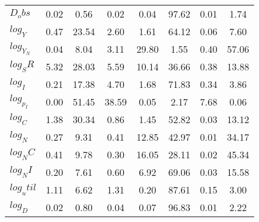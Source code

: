 \begin{center}
\begin{longtable}{lccccccc}
$D_obs     $	 & 	        0.02	 & 	        0.56	 & 	        0.02	 & 	        0.04	 & 	       97.62	 & 	        0.01	 & 	        1.74 \\ 
$log_Y     $	 & 	        0.47	 & 	       23.54	 & 	        2.60	 & 	        1.61	 & 	       64.12	 & 	        0.06	 & 	        7.60 \\ 
$log_Y_N   $	 & 	        0.04	 & 	        8.04	 & 	        3.11	 & 	       29.80	 & 	        1.55	 & 	        0.40	 & 	       57.06 \\ 
$log_SR    $	 & 	        5.32	 & 	       28.03	 & 	        5.59	 & 	       10.14	 & 	       36.66	 & 	        0.38	 & 	       13.88 \\ 
$log_I     $	 & 	        0.21	 & 	       17.38	 & 	        4.70	 & 	        1.68	 & 	       71.83	 & 	        0.34	 & 	        3.86 \\ 
$log_p_I   $	 & 	        0.00	 & 	       51.45	 & 	       38.59	 & 	        0.05	 & 	        2.17	 & 	        7.68	 & 	        0.06 \\ 
$log_C     $	 & 	        1.38	 & 	       30.34	 & 	        0.86	 & 	        1.45	 & 	       52.82	 & 	        0.03	 & 	       13.12 \\ 
$log_N     $	 & 	        0.27	 & 	        9.31	 & 	        0.41	 & 	       12.85	 & 	       42.97	 & 	        0.01	 & 	       34.17 \\ 
$log_NC    $	 & 	        0.41	 & 	        9.78	 & 	        0.30	 & 	       16.05	 & 	       28.11	 & 	        0.02	 & 	       45.34 \\ 
$log_NI    $	 & 	        0.20	 & 	        7.61	 & 	        0.60	 & 	        6.92	 & 	       69.06	 & 	        0.03	 & 	       15.58 \\ 
$log_util  $	 & 	        1.11	 & 	        6.62	 & 	        1.31	 & 	        0.20	 & 	       87.61	 & 	        0.15	 & 	        3.00 \\ 
$log_D     $	 & 	        0.02	 & 	        0.80	 & 	        0.04	 & 	        0.07	 & 	       96.83	 & 	        0.01	 & 	        2.22 \\ 
\end{longtable}
 \end{center}
